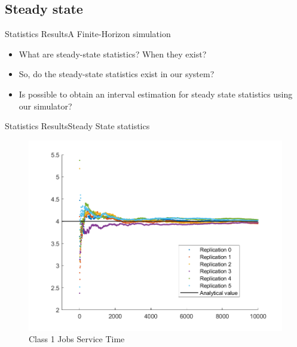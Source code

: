 \documentclass[10pt]{beamer}
\begin{document}
\subsection{Steady state}
\begin{frame}{Statistics Results}{A Finite-Horizon simulation}

\begin{itemize}

\item What are steady-state statistics? When they exist?
\item So, do the steady-state statistics exist in our system?
\item Is possible to obtain an interval estimation for steady state statistics using our simulator?
\end{itemize}

\end{frame}

\begin{frame}{Statistics Results}{Steady State statistics}

\begin{figure}
\centering
\includegraphics[width=\textwidth]{./images/ScatterPlotCloud_Class1JobsServiceTime.png}
\caption{Class 1 Jobs Service Time}
\label{fig:Concorrente}
\end{figure}
\end{frame}
\end{document}
